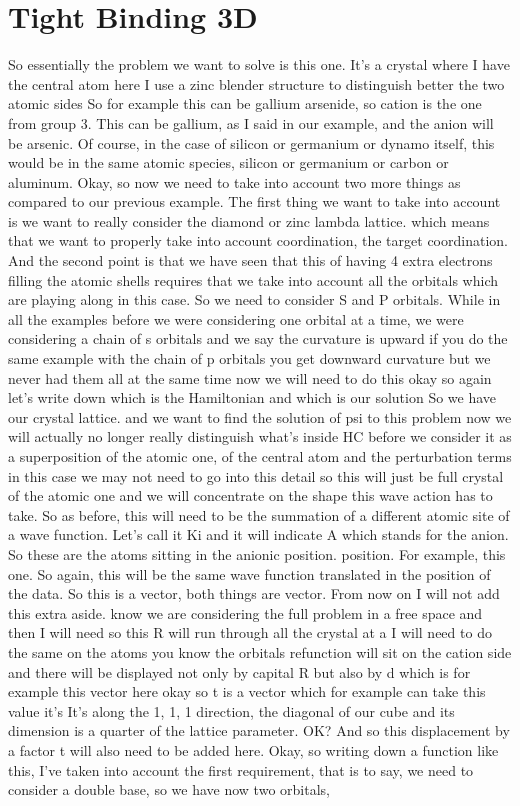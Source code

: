\section{Tight Binding 3D}
So essentially the problem we want to solve is this one. It's a crystal where I have the central atom here I use a zinc blender structure to distinguish better the two atomic sides So for example this can be gallium arsenide, so cation is the one from group 3. This can be gallium, as I said in our example, and the anion will be arsenic. Of course, in the case of silicon or germanium or dynamo itself, this would be in the same atomic species, silicon or germanium or carbon or aluminum. Okay, so now we need to take into account two more things as compared to our previous example. The first thing we want to take into account is we want to really consider the diamond or zinc lambda lattice. which means that we want to properly take into account coordination, the target coordination. And the second point is that we have seen that this of having 4 extra electrons filling the atomic shells requires that we take into account all the orbitals which are playing along in this case. So we need to consider S and P orbitals. While in all the examples before we were considering one orbital at a time, we were considering a chain of s orbitals and we say the curvature is upward if you do the same example with the chain of p orbitals you get downward curvature but we never had them all at the same time now we will need to do this okay so again let's write down which is the Hamiltonian and which is our solution So we have our crystal lattice. and we want to find the solution of psi to this problem now we will actually no longer really distinguish what's inside HC before we consider it as a superposition of the atomic one, of the central atom and the perturbation terms in this case we may not need to go into this detail so this will just be full crystal of the atomic one and we will concentrate on the shape this wave action has to take. So as before, this will need to be the summation of a different atomic site of a wave function. Let's call it Ki and it will indicate A which stands for the anion. So these are the atoms sitting in the anionic position. position. For example, this one. So again, this will be the same wave function translated in the position of the data. So this is a vector, both things are vector. From now on I will not add this extra aside. know we are considering the full problem in a free space and then I will need so this R will run through all the crystal at a I will need to do the same on the atoms you know the orbitals refunction will sit on the cation side and there will be displayed not only by capital R but also by d which is for example this vector here okay so t is a vector which for example can take this value it's It's along the 1, 1, 1 direction, the diagonal of our cube and its dimension is a quarter of the lattice parameter. OK? And so this displacement by a factor t will also need to be added here. Okay, so writing down a function like this, I've taken into account the first requirement, that is to say, we need to consider a double base, so we have now two orbitals, 